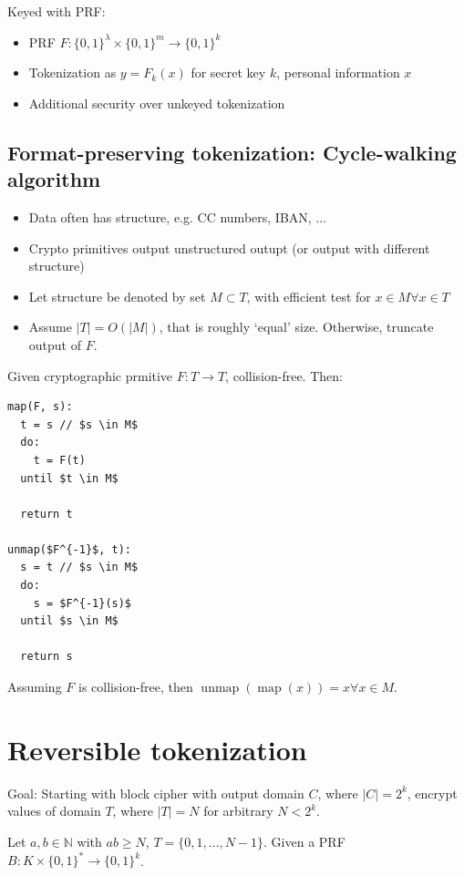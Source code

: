 \documentclass[a4paper]{scrreprt}
\begin{document}
Keyed with PRF:
\begin{itemize}
		\item PRF $F: \{0, 1\}^\lambda \times \{0, 1\}^m \rightarrow \{0, 1\}^k$
		\item Tokenization as $y = F_k(x)$ for secret key $k$, personal information $x$
		\item Additional security over unkeyed tokenization
\end{itemize}

\subsection{Format-preserving tokenization: Cycle-walking algorithm}

\begin{itemize}
		\item Data often has structure, e.g. CC numbers, IBAN, ...
		\item Crypto primitives output unstructured outupt (or output with
				different structure)
		\item Let structure be denoted by set $M \subset T$, with efficient
				test for $x \in M \forall x \in T$
		\item Assume $|T| = O(|M|)$, that is roughly `equal' size. Otherwise,
				truncate output of $F$.
\end{itemize}

Given cryptographic prmitive $F : T \rightarrow T$, collision-free. Then:

\begin{lstlisting}[mathescape=true]
map(F, s):
  t = s // $s \in M$
  do:
    t = F(t)
  until $t \in M$

  return t

unmap($F^{-1}$, t):
  s = t // $s \in M$
  do:
    s = $F^{-1}(s)$
  until $s \in M$

  return s
\end{lstlisting}

Assuming $F$ is collision-free, then
$\operatorname{unmap}(\operatorname{map}(x)) = x \forall x \in M$.

\section{Reversible tokenization}

Goal: Starting with block cipher with output domain $C$, where $|C| = 2^k$,
encrypt values of domain $T$, where $|T| = N$ for arbitrary $N < 2^k$.

Let $a, b \in \mathbb{N}$ with $ab \geq N$, $T = \{0, 1, \ldots, N - 1\}$.
Given a PRF $B : K \times \{0, 1\}^* \rightarrow \{0, 1\}^k$.
\end{document}
